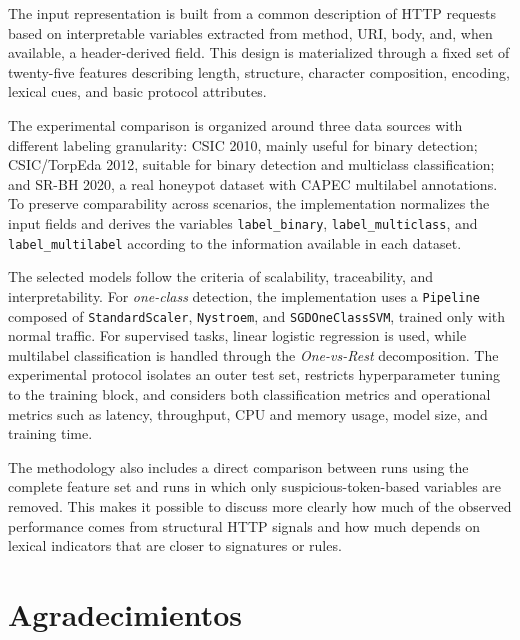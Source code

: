 \documentclass[12pt,oneside]{report}
\begin{document}
The input representation is built from a common description of HTTP requests based on interpretable variables extracted from method, URI, body, and, when available, a header-derived field. This design is materialized through a fixed set of twenty-five features describing length, structure, character composition, encoding, lexical cues, and basic protocol attributes.

The experimental comparison is organized around three data sources with different labeling granularity: CSIC 2010, mainly useful for binary detection; CSIC/TorpEda 2012, suitable for binary detection and multiclass classification; and SR-BH 2020, a real honeypot dataset with CAPEC multilabel annotations. To preserve comparability across scenarios, the implementation normalizes the input fields and derives the variables \texttt{label\_binary}, \texttt{label\_multiclass}, and \texttt{label\_multilabel} according to the information available in each dataset.

The selected models follow the criteria of scalability, traceability, and interpretability. For \textit{one-class} detection, the implementation uses a \texttt{Pipeline} composed of \texttt{StandardScaler}, \texttt{Nystroem}, and \texttt{SGDOneClassSVM}, trained only with normal traffic. For supervised tasks, linear logistic regression is used, while multilabel classification is handled through the \textit{One-vs-Rest} decomposition. The experimental protocol isolates an outer test set, restricts hyperparameter tuning to the training block, and considers both classification metrics and operational metrics such as latency, throughput, CPU and memory usage, model size, and training time.

The methodology also includes a direct comparison between runs using the complete feature set and runs in which only suspicious-token-based variables are removed. This makes it possible to discuss more clearly how much of the observed performance comes from structural HTTP signals and how much depends on lexical indicators that are closer to signatures or rules.

\chapter*{Agradecimientos}

\tableofcontents
\listoffigures
\clearpage
{}

\end{document}
